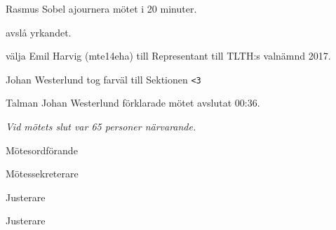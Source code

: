 \documentclass[10pt]{article}
\def\mo{Johan Westerlund}
\def\ms{Erik Månsson}
\def\ji{David Uhler Brand}
\def\jii{Fredrik Nilsson}
\begin{document}
\begin{paragrafer}
\begin{paralist}
    Rasmus Sobel \ypa ajournera mötet i 20 minuter.

    \Mba avslå yrkandet.


    \Mba välja Emil Harvig (mte14eha) till Representant till TLTH:s valnämnd 2017.

\end{paralist}

Johan Westerlund tog farväl till Sektionen \texttt{<3}

Talman {\mo} förklarade mötet avslutat 00:36.

\emph{Vid mötets slut var 65 personer närvarande.}

\end{paragrafer}

\hidesignfoot
\begin{signatures}{4}
\signature{\mo}{Mötesordförande}
\signature{\ms}{Mötessekreterare}
\signature{\ji}{Justerare}
\signature{\jii}{Justerare}
\end{signatures}
\end{document}
